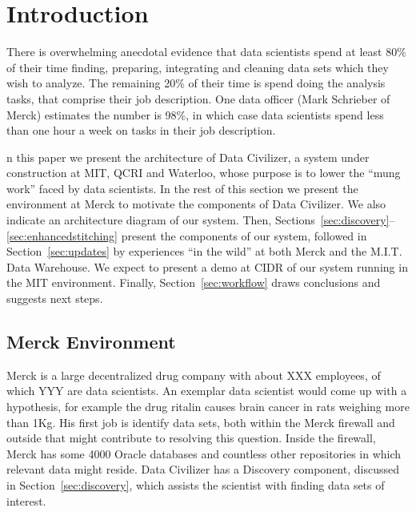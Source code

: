 \section{Introduction}
\label{introduction}

There is overwhelming anecdotal evidence that data scientists spend at least 80\%
of their time finding, preparing, integrating and cleaning data sets which they
wish to analyze. The remaining 20\% of their time is spend doing the analysis
tasks, that comprise their job description.  One data officer (Mark Schrieber of
Merck) estimates the number is 98\%, in which case data scientists spend less
than one hour a week on tasks in their job description.

n this paper we present the architecture of Data Civilizer, a system under
construction at MIT, QCRI and Waterloo, whose purpose is to lower the ``mung work'' faced by data scientists.  In the rest of this section we present the
environment at Merck to motivate the components of Data Civilizer.  We also
indicate an architecture diagram of our system.  Then, Sections~\ref{sec:discovery}--\ref{sec:enhancedstitching} present the
components of our system, followed in Section~\ref{sec:updates} by experiences ``in the wild'' at
both Merck and the M.I.T. Data Warehouse.  We expect to present a demo at CIDR
of our system running in the MIT environment.   Finally, Section~\ref{sec:workflow} draws
conclusions and suggests next steps.

\subsection{Merck Environment}

Merck is a large decentralized drug company with about XXX employees, of which
YYY are data scientists.  An exemplar data scientist would come up with a
hypothesis, for example the drug ritalin causes brain cancer in rats weighing
more than 1Kg.  His first job is identify data sets, both within the Merck
firewall and outside that might contribute to resolving this question.  Inside
the firewall, Merck has some 4000 Oracle databases and countless other
repositories in which relevant data might reside.  Data Civilizer has a
Discovery component, discussed in Section~\ref{sec:discovery}, which assists the scientist with
finding data sets of interest.

